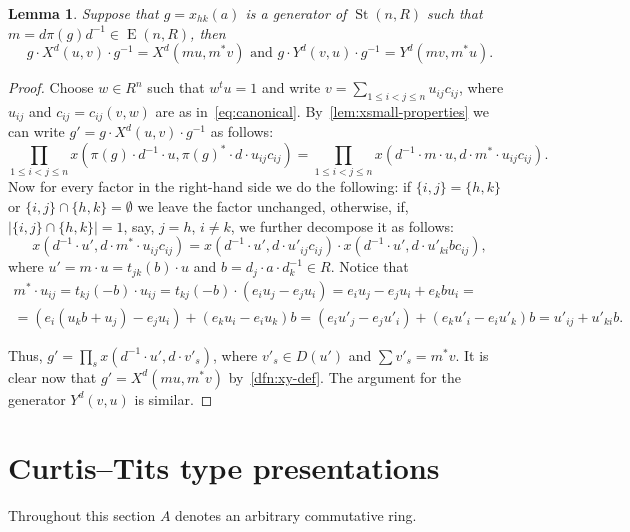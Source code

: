 \documentclass[oneside, 10pt]{amsart}
\DeclareMathOperator{\St}{St}
\DeclareMathOperator{\E}{E}
\numberwithin{equation}{section}
\numberwithin{thm}{section}
\newtheorem{lemma}[thm]{Lemma}
\numberwithin{lemma}{section}
\theoremstyle{definition}
\theoremstyle{remark}
\begin{document}
\begin{lemma}
\label{lem:xy-conj} Suppose that $g = x_{hk}(a)$ is a generator of $\St(n, R)$ such that $m = d\pi(g)d^{-1} \in \E(n, R)$, then
\begin{equation*}
g \cdot X^d(u, v) \cdot g^{-1} = X^d(mu, m^*v) \text{ and } g \cdot Y^d(v, u) \cdot g^{-1} = Y^d(mv, m^*u).
\end{equation*}
\end{lemma}
\begin{proof}
Choose $w\in R^n$ such that $w^t u = 1$ and write $v = \sum_{1\leq i<j\leq n} u_{ij} c_{ij}$, where $u_{ij}$ and $c_{ij} = c_{ij}(v, w)$ are as in~\eqref{eq:canonical}.
By~\cref{lem:xsmall-properties} we can write $g' = g \cdot X^d(u, v) \cdot g^{-1}$ as follows:
\begin{equation} \nonumber
\prod\limits_{1\leq i<j\leq n} x(\pi(g) \cdot d^{-1} \cdot u, \pi(g)^* \cdot d \cdot u_{ij}c_{ij})
= \prod\limits_{1\leq i<j\leq n} x( d^{-1} \cdot m \cdot u, d \cdot m^* \cdot u_{ij}c_{ij}).
\end{equation}
Now for every factor in the right-hand side we do the following:
if $\{i, j\} = \{h, k\}$ or $\{i, j\} \cap \{h, k\} = \emptyset$ we leave the factor unchanged,
otherwise, if, $|\{i, j\} \cap \{h, k\}| = 1$, say, $j = h$, $i\neq k$, we further decompose it as follows:
\begin{equation} \nonumber
x(d^{-1} \cdot u', d \cdot m^* \cdot u_{ij} c_{ij}) =
x(d^{-1} \cdot u', d \cdot u'_{ij} c_{ij}) \cdot
x(d^{-1} \cdot u', d \cdot u'_{ki} bc_{ij}),
\end{equation}
where $u' = m \cdot u = t_{jk}(b) \cdot u$ and $b = d_j \cdot a \cdot d_k^{-1} \in R$.
Notice that
\begin{multline*}
m^* \cdot u_{ij} = t_{kj}(-b) \cdot u_{ij} = t_{kj}(-b) \cdot (e_i u_j-e_j u_i) = e_iu_j - e_ju_i + e_k b u_i =
\\ = \left(e_i (u_kb + u_j) - e_j u_i\right) + (e_k u_i-e_i u_k)b = (e_i u'_j-e_j u'_i) + (e_k u'_i-e_i u'_k)b = u'_{ij}+u'_{ki}b.
\end{multline*}

Thus, $g' = \prod_{s} x(d^{-1} \cdot u', d \cdot v'_s) $, where $v'_s \in D(u')$ and $\sum v'_s = m^*v$.
It is clear now that $g' = X^d(m u, m^* v)$ by~\cref{dfn:xy-def}.
The argument for the generator $Y^d(v, u)$ is similar.
\end{proof}



\section{Curtis--Tits type presentations} \label{sec:affine}
Throughout this section $A$ denotes an arbitrary commutative ring.
\end{document}
